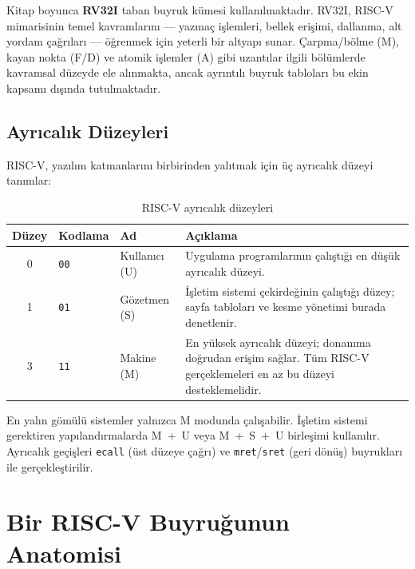 \begin{bilginot}
Kitap boyunca \textbf{RV32I} taban buyruk kümesi kullanılmaktadır. RV32I, RISC-V mimarisinin temel kavramlarını --- yazmaç işlemleri, bellek erişimi, dallanma, alt yordam çağrıları --- öğrenmek için yeterli bir altyapı sunar. Çarpma/bölme (M), kayan nokta (F/D) ve atomik işlemler (A) gibi uzantılar ilgili bölümlerde kavramsal düzeyde ele alınmakta, ancak ayrıntılı buyruk tabloları bu ekin kapsamı dışında tutulmaktadır.
\end{bilginot}

\subsection{Ayrıcalık Düzeyleri}
\label{subsec:ekc-ayricalik}

RISC-V, yazılım katmanlarını birbirinden yalıtmak için üç ayrıcalık düzeyi tanımlar:

\begin{table}[H]
\centering
\caption{RISC-V ayrıcalık düzeyleri}\label{tab:ekc-ayricalik}
\begin{tabular}{@{}cllp{7.5cm}@{}}
\toprule
\textbf{Düzey} & \textbf{Kodlama} & \textbf{Ad} & \textbf{Açıklama} \\
\midrule
0 & \texttt{00} & Kullanıcı (U) & Uygulama programlarının çalıştığı en düşük ayrıcalık düzeyi. \\
1 & \texttt{01} & Gözetmen (S) & İşletim sistemi çekirdeğinin çalıştığı düzey; sayfa tabloları ve kesme yönetimi burada denetlenir. \\
3 & \texttt{11} & Makine (M) & En yüksek ayrıcalık düzeyi; donanıma doğrudan erişim sağlar. Tüm RISC-V gerçeklemeleri en az bu düzeyi desteklemelidir. \\
\bottomrule
\end{tabular}
\end{table}

En yalın gömülü sistemler yalnızca M modunda çalışabilir. İşletim sistemi gerektiren yapılandırmalarda M~+~U veya M~+~S~+~U birleşimi kullanılır. Ayrıcalık geçişleri \texttt{ecall} (üst düzeye çağrı) ve \texttt{mret}/\texttt{sret} (geri dönüş) buyrukları ile gerçekleştirilir.

\section{Bir RISC-V Buyruğunun Anatomisi}
\label{sec:ekc-buyruk-anatomisi}

